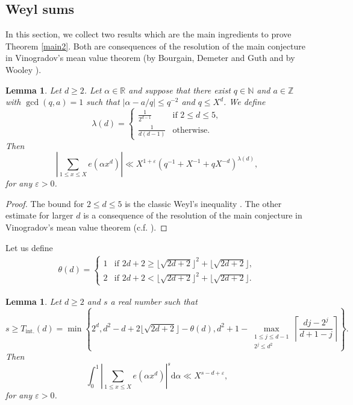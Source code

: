 \documentclass[reqno, 12pt, reqno]{amsart}
\numberwithin{equation}{section}
\newtheorem{lemma}[theorem]{Lemma}
\newcommand{\ZZ}{\mathbb{Z}}
\newcommand{\NN}{\mathbb{N}}
\newcommand{\RR}{\mathbb{R}}
\renewcommand{\leq}{\leqslant}
\renewcommand{\geq}{\geqslant}
\renewcommand{\=}{\equiv}
\begin{document}
\subsection{Weyl sums}
In this section, we collect two results which are the main ingredients to prove Theorem \ref{main2}.
Both are consequences of the resolution of the main conjecture in Vinogradov's mean value theorem (by Bourgain, Demeter and  Guth \cite{BDG} and by Wooley \cite{WooCub, Wooley}).
\begin{lemma}\label{lem:weyl}
Let $d \geq 2$. Let $\alpha \in \RR$ and suppose that there exist $q \in \NN$ and $a \in \ZZ$  with $\gcd(q, a)=1$ such that $\vert \alpha - a/q \vert \leq q^{-2}$ and $q \leq X^d$.
We define
\[
\lambda(d) =
\begin{cases}
\frac{1}{2^{d-1}} & \mbox{if } 2 \leq d \leq 5, \\
\frac{1}{d(d - 1)}& \mbox{otherwise.}
\end{cases}
\]
Then
\[
\left \vert \sum_{1 \leq  x \leq X} e(\alpha x^d) \right \vert
\ll
X^{1+\varepsilon} ( q^{-1} + X^{-1} + q X^{-d})^{\lambda(d)},
\]
for any $\varepsilon > 0$.
\end{lemma}
\begin{proof}
The bound for $2 \leq d \leq 5$ is the classic Weyl's inequality \cite[Lemma 2.4]{Vaughan}.
The other estimate for larger $d$ is a consequence of the resolution of the main conjecture in Vinogradov's mean value theorem (c.f. \cite[Lemma 2.4]{Campana}).
\end{proof}

Let us define
\begin{eqnarray}
\label{deftheta}
\theta(d) = \begin{cases}
              1 & \mbox{if } 2d + 2 \geq \lfloor  \sqrt{2d + 2} \rfloor^2 + \lfloor  \sqrt{2d + 2} \rfloor,   \\
              2 & \mbox{if } 2d + 2 < \lfloor  \sqrt{2d + 2} \rfloor^2 + \lfloor  \sqrt{2d + 2} \rfloor.
            \end{cases}
\end{eqnarray}
\begin{lemma}\label{lem:mvt}
Let $d \geq 2$ and $s$ a real number such that $$s \geq T_{\text{int.}}(d) = \min\left\{2^d,d^2 - d + 2 \lfloor \sqrt{2d+2} \rfloor - \theta(d),  d^2 +1 - \max \limits_{\substack{1 \leq j \leq d-1 \\ 2^j \leq d^2}} \left \lceil \frac{dj - 2^j}{d+1 - j} \right \rceil \right\}.$$ Then
\[
\int_0^1 \left \vert \sum_{1 \leq x \leq X} e(\alpha x^d) \right \vert^s \mathrm{d} \alpha \ll X^{s - d + \varepsilon},
\]
for any $\varepsilon > 0$.
\end{lemma}
\end{document}
